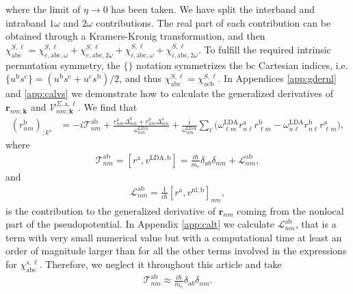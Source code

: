 \noindent where the limit of $\eta\to 0$ has been taken.
We have split the interband and intraband $1\omega$ and $2\omega$
contributions. The real part of each contribution can be obtained through
a Kramers-Kronig transformation,\cite{nicolas} and then
$\chi^{S,\ell}_{\mathrm{abc}}=\chi^{S,\ell}_{e,\mathrm{abc},\omega} 
+\chi^{S,\ell}_{e,\mathrm{abc},2\omega}+\chi^{S,\ell}_{i,\mathrm{abc},\omega}
+\chi^{S,\ell}_{i,\mathrm{abc},2\omega}
$.
To fulfill the required intrinsic permutation symmetry,\cite{rashkeevPRB98} the
$\{\}$ notation symmetrizes the $\mathrm{b}\mathrm{c}$ Cartesian indices, i.e. $
\{u^{\mathrm{b}}s^{\mathrm{c}}\}=(u^{\mathrm{b}}s^{\mathrm{c}}+u^{\mathrm{c}}s^{
\mathrm{b}})/2$, and thus
$\chi_{\mathrm{abc}}^{S,\ell}=\chi_{\mathrm{a}\mathrm{c}\mathrm{b}}^{S,\ell}$.
In Appendices \ref{app:gdernl} and \ref{app:calvs} we demonstrate how to
calculate the generalized derivatives of $\mathbf{r}_{nm;\mathbf{k}}$ and
$\mathcal{V}^{\Sigma,\mathrm{a},\ell}_{nm;\mathbf{k}}$. We find that
\begin{align}\label{rgen.69}
(r^{\mathrm{b}}_{nm})_{;k^{\mathrm{a}}}
&=
-i\mathcal{T}^{\mathrm{a}\mathrm{b}}_{nm}
+
\frac{
r^{\mathrm{a}}_{nm}
\Delta^{\mathrm{b}}_{mn}
+r^{\mathrm{b}}_{nm}
\Delta^{\mathrm{a}}_{mn}
}
{\omega^{\mathrm{LDA}}_{nm}}
+
\frac{i}{\omega^{\mathrm{LDA}}_{nm}}
\sum_{\ell}
\bigg(
\omega^{\mathrm{LDA}}_{\ell m}
r^{\mathrm{a}}_{n\ell}
r^{\mathrm{b}}_{\ell m}
-
\omega^{\mathrm{LDA}}_{n\ell}
r^{\mathrm{b}}_{n\ell}
r^{\mathrm{a}}_{\ell m}
\bigg)
,
\end{align}
where
\begin{align}\label{tau.1}
\mathcal{T}_{nm}^{\mathrm{a}\mathrm{b}}
=
[r^{\mathrm{a}},v^{\mathrm{LDA},\mathrm{b}}]= 
\frac{i\hbar}{m_{e}}\delta_{ab}\delta_{nm} +
\mathcal{L}_{nm}^{\mathrm{a}\mathrm{b}}
,
\end{align}  
and
\begin{align}\label{tau.2}
\mathcal{L}_{nm}^{\mathrm{a}\mathrm{b}}
= \frac{1}{i\hbar}[r^{\mathrm{a}},v^{\mathrm{nl},\mathrm{b}}]_{nm}
,
\end{align}
is the contribution to the generalized derivative of $\mathbf{r}_{nm}$
coming from the nonlocal part of the pseudopotential.
In Appendix \ref{app:calt} we calculate
$\mathcal{L}^{\mathrm{a}\mathrm{b}}_{nm}$, that
is a term with very small numerical value but with a computational time 
at least an order of magnitude larger
than for all the other terms involved in the expressions for 
$\chi^{s,\ell}_{\mathrm{abc}}$.\cite{valerie}
Therefore, we neglect it throughout this article and take
\begin{align}\label{tau.69}
\mathcal{T}_{nm}^{\mathrm{a}\mathrm{b}}
\approx
\frac{i\hbar}{m_{e}}\delta_{ab}\delta_{nm}
.
\end{align} 
